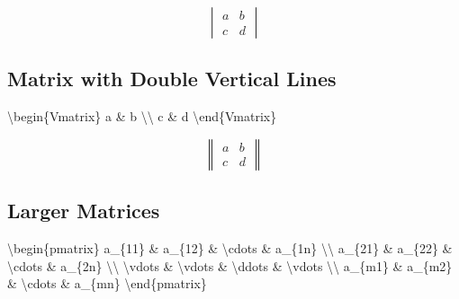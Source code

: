 \documentclass[
  letterpaper,
  DIV=11,
  numbers=noendperiod]{scrartcl}
\newenvironment{Shaded}{\begin{snugshade}}{\end{snugshade}}
\newcommand{\ExtensionTok}[1]{\textcolor[rgb]{0.00,0.23,0.31}{#1}}
\newcommand{\KeywordTok}[1]{\textcolor[rgb]{0.00,0.23,0.31}{#1}}
\newcommand{\NormalTok}[1]{\textcolor[rgb]{0.00,0.23,0.31}{#1}}
\newcommand{\SpecialCharTok}[1]{\textcolor[rgb]{0.37,0.37,0.37}{#1}}
\newcommand{\SpecialStringTok}[1]{\textcolor[rgb]{0.13,0.47,0.30}{#1}}
\begin{document}
\[\begin{vmatrix}
a & b \\
c & d
\end{vmatrix}\]

\hypertarget{matrix-with-double-vertical-lines}{%
\subsection{Matrix with Double Vertical
Lines}\label{matrix-with-double-vertical-lines}}

\begin{Shaded}
\begin{Highlighting}[]
\SpecialStringTok{$$}\KeywordTok{\textbackslash{}begin}\NormalTok{\{}\ExtensionTok{Vmatrix}\NormalTok{\}}
\SpecialStringTok{a \& b }\SpecialCharTok{\textbackslash{}\textbackslash{}}
\SpecialStringTok{c \& d}
\KeywordTok{\textbackslash{}end}\NormalTok{\{}\ExtensionTok{Vmatrix}\NormalTok{\}}\SpecialStringTok{$$}
\end{Highlighting}
\end{Shaded}

\[\begin{Vmatrix}
a & b \\
c & d
\end{Vmatrix}\]

\hypertarget{larger-matrices}{%
\subsection{Larger Matrices}\label{larger-matrices}}

\begin{Shaded}
\begin{Highlighting}[]
\SpecialStringTok{$$}\KeywordTok{\textbackslash{}begin}\NormalTok{\{}\ExtensionTok{pmatrix}\NormalTok{\}}
\SpecialStringTok{a\_\{11\} \& a\_\{12\} \& }\SpecialCharTok{\textbackslash{}cdots}\SpecialStringTok{ \& a\_\{1n\} }\SpecialCharTok{\textbackslash{}\textbackslash{}}
\SpecialStringTok{a\_\{21\} \& a\_\{22\} \& }\SpecialCharTok{\textbackslash{}cdots}\SpecialStringTok{ \& a\_\{2n\} }\SpecialCharTok{\textbackslash{}\textbackslash{}}
\SpecialCharTok{\textbackslash{}vdots}\SpecialStringTok{ \& }\SpecialCharTok{\textbackslash{}vdots}\SpecialStringTok{ \& }\SpecialCharTok{\textbackslash{}ddots}\SpecialStringTok{ \& }\SpecialCharTok{\textbackslash{}vdots}\SpecialStringTok{ }\SpecialCharTok{\textbackslash{}\textbackslash{}}
\SpecialStringTok{a\_\{m1\} \& a\_\{m2\} \& }\SpecialCharTok{\textbackslash{}cdots}\SpecialStringTok{ \& a\_\{mn\}}
\KeywordTok{\textbackslash{}end}\NormalTok{\{}\ExtensionTok{pmatrix}\NormalTok{\}}\SpecialStringTok{$$}
\end{Highlighting}
\end{Shaded}
\end{document}
